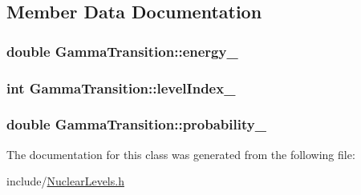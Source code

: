 \subsection{Member Data Documentation}
\hypertarget{classGammaTransition_a548b2d968c5866e6a2ed47755ade3ff4}{
\subsubsection[{energy\-\_\-}]{\setlength{\rightskip}{0pt plus 5cm}double Gamma\-Transition\-::energy\-\_\-}}\label{classGammaTransition_a548b2d968c5866e6a2ed47755ade3ff4}
\hypertarget{classGammaTransition_a021b75eb240faa0a828666d944dd133f}{
\subsubsection[{level\-Index\-\_\-}]{\setlength{\rightskip}{0pt plus 5cm}int Gamma\-Transition\-::level\-Index\-\_\-}}\label{classGammaTransition_a021b75eb240faa0a828666d944dd133f}
\hypertarget{classGammaTransition_a056ef79f20cab353c9b577c720cdf8e4}{
\subsubsection[{probability\-\_\-}]{\setlength{\rightskip}{0pt plus 5cm}double Gamma\-Transition\-::probability\-\_\-}}\label{classGammaTransition_a056ef79f20cab353c9b577c720cdf8e4}


The documentation for this class was generated from the following file\-:\begin{DoxyCompactItemize}
\item 
include/\hyperlink{NuclearLevels_8h}{Nuclear\-Levels.\-h}\end{DoxyCompactItemize}
